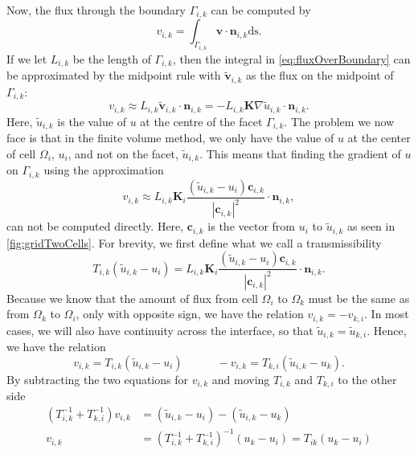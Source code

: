 Now, the flux through the boundary $\Gamma_{i,k}$ can be computed by
\begin{equation}
    v_{i,k} = \int_{\Gamma_{i,k}} \textbf{v}\cdot\textbf{n}_{i,k} \mbox{ds}. 
    \label{eq:fluxOverBoundary}
\end{equation}
If we let $L_{i,k}$ be the length of $\Gamma_{i,k}$, then the integral in \eqref{eq:fluxOverBoundary} can be approximated by the midpoint rule with $\tilde{\textbf{v}}_{i,k}$ as the flux on the midpoint of $\Gamma_{i,k}$: 
\begin{equation*}
    v_{i,k} \approx L_{i,k}\tilde{\textbf{v}}_{i,k} \cdot \textbf{n}_{i,k} = -L_{i,k}\textbf{K}\nabla \tilde{u}_{i,k} \cdot \textbf{n}_{i,k}.
\end{equation*}
Here, $\tilde{u}_{i,k}$ is the value of $u$ at the centre of the facet $\Gamma_{i,k}$. The problem we now face is that in the finite volume method, we only have the value of $u$ at the center of cell $\Omega_i$, $u_i$, and not on the facet, $\tilde{u}_{i,k}$. This means that finding the gradient of $u$ on $\Gamma_{i,k}$ using the approximation
\begin{equation*}
    v_{i,k} \approx L_{i,k}\textbf{K}_i\frac{(\tilde{u}_{i,k} - u_i)\textbf{c}_{i,k}}{|\textbf{c}_{i,k}|^2} \cdot \textbf{n}_{i,k},
\end{equation*}
can not be computed directly. Here, $\textbf{c}_{i,k}$ is the vector from $u_i$ to $\tilde{u}_{i,k}$ as seen in \autoref{fig:gridTwoCells}.  For brevity, we first define what we call a transmissibility
\begin{equation}
    T_{i,k}(\tilde{u}_{i,k} - u_i) = L_{i,k}\textbf{K}_i\frac{(\tilde{u}_{i,k} - u_i)\textbf{c}_{i,k}}{|\textbf{c}_{i,k}|^2} \cdot \textbf{n}_{i,k}.
    \label{eq:transmissibility}
\end{equation}
Because we know that the amount of flux from cell $\Omega_i$ to $\Omega_k$ must be the same as from $\Omega_k$ to $\Omega_i$, only with opposite sign, we have the relation $v_{i,k} = -v_{k,i}$.  In most cases, we will also have continuity across the interface, so that $\tilde{u}_{i,k} = \tilde{u}_{k,i}$. Hence, we have the relation 
\begin{equation*}
    v_{i,k} = T_{i,k}(\tilde{u}_{i,k} - u_i) \hspace{3em} -v_{i,k} = T_{k,i}(\tilde{u}_{i,k} - u_k).
\end{equation*}
By subtracting the two equations for $v_{i,k}$ and moving $T_{i,k}$ and $T_{k,i}$ to the other side 
\begin{equation}
    \begin{aligned}
        (T_{i,k}^{-1} + T_{k,i}^{-1}) v_{i,k} &= (\tilde{u}_{i,k} - u_i) - (\tilde{u}_{i,k} - u_k)
        \\
        v_{i,k} &= (T_{i,k}^{-1} + T_{k,i}^{-1})^{-1}(u_k - u_i) = T_{ik}(u_k - u_i)
    \end{aligned}
    \label{eq:flux}
\end{equation}
